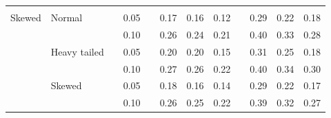 \documentclass[12pt]{article} %
\begin{document}
\begin{table}[ht]
\begin{scriptsize}
\begin{center}
\begin{tabular}{ll p{.1cm} c p{.1cm} rrr p{.1cm} rrr}
             &&&&&&&&&&&\\
Skewed       & Normal       && 0.05 &&  0.17 & 0.16 & 0.12 && 0.29 & 0.22 & 0.18 \\ 
             &              && 0.10 &&  0.26 & 0.24 & 0.21 && 0.40 & 0.33 & 0.28 \\ 
             & Heavy tailed && 0.05 &&  0.20 & 0.20 & 0.15 && 0.31 & 0.25 & 0.18 \\ 
             &              && 0.10 &&  0.27 & 0.26 & 0.22 && 0.40 & 0.34 & 0.30 \\ 
             & Skewed       && 0.05 &&  0.18 & 0.16 & 0.14 && 0.29 & 0.22 & 0.17 \\ 
             &              && 0.10 &&  0.26 & 0.25 & 0.22 && 0.39 & 0.32 & 0.27 \\ 

\hline
\end{tabular}
\end{center}
\end{scriptsize}
\end{table}
\end{document}

